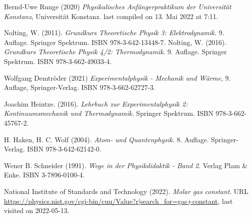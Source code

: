 \documentclass[../main.tex]{subfiles}
\begin{document}
	\begin{thebibliography}{99}
		 Bernd-Uwe Runge (2020) \emph{Physikalisches Anfängerpraktikum der Universität Konstanz}, Universität Konstanz. last compiled on 13. Mai 2022 at 7:11. 

		 Nolting, W. (2011). \emph{Grundkurs Theoretische Physik 3: Elektrodynamik}. 9. Auflage. Springer Spektrum. ISBN 978-3-642-13448-7.
		 Nolting, W. (2016). \emph{Grundkurs Theoretische Physik 4/2: Thermodynamik}. 9. Auflage. Springer Spektrum. ISBN 978-3-662-49033-4.

		 Wolfgang Demtröder (2021) \emph{Experimentalphysik - Mechanik und Wärme}, 9. Auflage, Springer-Verlag. ISBN 978-3-662-62727-3.
		
		 Joachim Heintze. (2016). \emph{Lehrbuch zur Experimentalphysik 2: Kontinuumsmechanik und Thermodynamik}. Springer Spektrum. ISBN 978-3-662-45767-2.


		 H. Haken, H. C. Wolf (2004). \emph{Atom- und Quantenphysik}. 8. Auflage. Springer-Verlag. ISBN 978-3-642-62142-0.

		 Wener B. Schneider (1991). \emph{Wege in der Physikdidaktik - Band 2}. Verlag Plam \& Enke. ISBN 3-7896-0100-4.

		 National Institute of Standards and Technology (2022). \emph{Molar gas constant}. URL \url{https://physics.nist.gov/cgi-bin/cuu/Value?r|search_for=gas+constant}, last visited on 2022-05-13.


\end{thebibliography}
\end{document}
